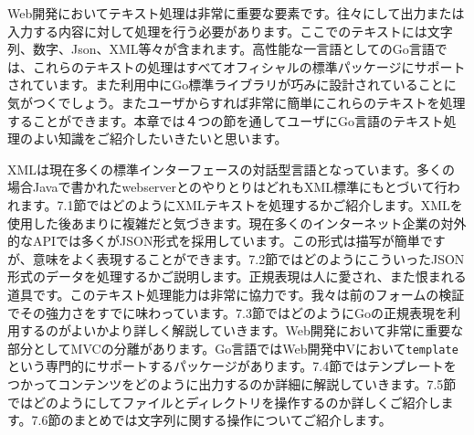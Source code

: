 Web開発においてテキスト処理は非常に重要な要素です。往々にして出力または入力する内容に対して処理を行う必要があります。ここでのテキストには文字列、数字、Json、XML等々が含まれます。高性能な一言語としてのGo言語では、これらのテキストの処理はすべてオフィシャルの標準パッケージにサポートされています。また利用中にGo標準ライブラリが巧みに設計されていることに気がつくでしょう。またユーザからすれば非常に簡単にこれらのテキストを処理することができます。本章では４つの節を通してユーザにGo言語のテキスト処理のよい知識をご紹介したいきたいと思います。

XMLは現在多くの標準インターフェースの対話型言語となっています。多くの場合Javaで書かれたwebserverとのやりとりはどれもXML標準にもとづいて行われます。7.1節ではどのようにXMLテキストを処理するかご紹介します。XMLを使用した後あまりに複雑だと気づきます。現在多くのインターネット企業の対外的なAPIでは多くがJSON形式を採用しています。この形式は描写が簡単ですが、意味をよく表現することができます。7.2節ではどのようにこういったJSON形式のデータを処理するかご説明します。正規表現は人に愛され、また恨まれる道具です。このテキスト処理能力は非常に協力です。我々は前のフォームの検証でその強力さをすでに味わっています。7.3節ではどのようにGoの正規表現を利用するのがよいかより詳しく解説していきます。Web開発において非常に重要な部分としてMVCの分離があります。Go言語ではWeb開発中Vにおいて\texttt{template}という専門的にサポートするパッケージがあります。7.4節ではテンプレートをつかってコンテンツをどのように出力するのか詳細に解説していきます。7.5節ではどのようにしてファイルとディレクトリを操作するのか詳しくご紹介します。7.6節のまとめでは文字列に関する操作についてご紹介します。
